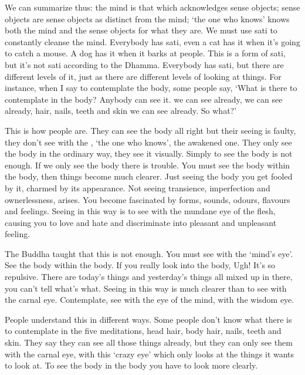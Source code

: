 We can summarize thus: the mind is that which acknowledges sense objects; sense objects are sense objects as distinct from the mind; `the one who knows' knows both the mind and the sense objects for what they are. We must use sati to constantly cleanse the mind. Everybody has sati, even a cat has it when it's going to catch a mouse. A dog has it when it barks at people. This is a form of sati, but it's not sati according to the Dhamma. Everybody has sati, but there are different levels of it, just as there are different levels of looking at things. For instance, when I say to contemplate the body, some people say, `What is there to contemplate in the body? Anybody can see it.  we can see already,  we can see already, hair, nails, teeth and skin we can see already. So what?' 

This is how people are. They can see the body all right but their seeing is faulty, they don't see with the , `the one who knows', the awakened one. They only see the body in the ordinary way, they see it visually. Simply to see the body is not enough. If we only see the body there is trouble. You must see the body within the body, then things become much clearer. Just seeing the body you get fooled by it, charmed by its appearance. Not seeing transience, imperfection and ownerlessness,  arises. You become fascinated by forms, sounds, odours, flavours and feelings. Seeing in this way is to see with the mundane eye of the flesh, causing you to love and hate and discriminate into pleasant and unpleasant feeling.

The Buddha taught that this is not enough. You must see with the `mind's eye'. See the body within the body. If you really look into the body, Ugh! It's so repulsive. There are today's things and yesterday's things all mixed up in there, you can't tell what's what. Seeing in this way is much clearer than to see with the carnal eye. Contemplate, see with the eye of the mind, with the wisdom eye. 

People understand this in different ways. Some people don't know what there is to contemplate in the five meditations, head hair, body hair, nails, teeth and skin. They say they can see all those things already, but they can only see them with the carnal eye, with this `crazy eye' which only looks at the things it wants to look at. To see the body in the body you have to look more clearly. 

